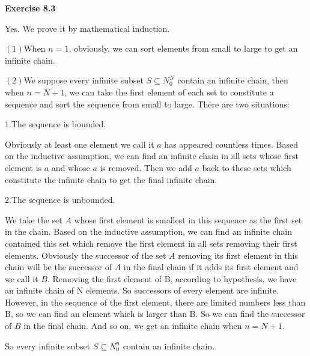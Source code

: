 \documentclass{article} %
\begin{document}
	\textbf{Exercise 8.3}\par
    Yes. We prove it by mathematical induction.\par
    $(1)$When $n=1$, obviously, we can sort elements from small to large to get an infinite chain.\par
    $(2)$We suppose every infinite subset $S \subseteq N_0^N$ contain an infinite chain, then when $n=N+1$, we can take the first element of each set to constitute a sequence and sort the sequence from small to large. There are two situations:\par
    $1.$The sequence is bounded.\par
    Obviously at least one element we call it $a$ has appeared countless times. Based on the inductive assumption, we can find an infinite chain in all sets whose first element is $a$ and whose $a$ is removed. Then we add $a$ back to these sets which constitute the infinite chain to get the final infinite chain.\par
    $2.$The sequence is unbounded.\par
    We take the set $A$ whose first element is smallest in this sequence as the first set in the chain. Based on the inductive assumption, we can find an infinite chain contained this set which remove the first element in all sets removing their first elements. Obviously the successor of the set $A$ removing its first element in this chain will be the successor of $A$ in the final chain if it adds its first element and we call it $B$. Removing the first element of B, according to hypothesis, we have an infinite chain of N elements. So successors of every element are infinite. However, in the sequence of the first element, there are limited numbers less than B, so we can find an element which is larger than B. So we can find the successor of $B$ in the final chain. And so on, we get an infinite chain when $n=N+1$.\par
    So every infinite subset $S \subseteq N_0^n$ contain an infinite chain.


	
\end{document}
